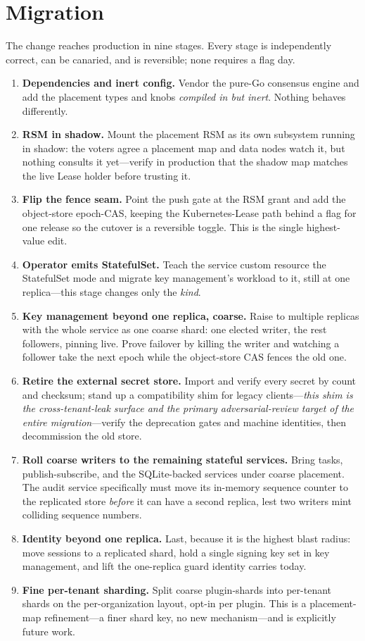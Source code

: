 \documentclass[11pt]{article}
\begin{document}
\section{Migration}
\label{sec:migration}

The change reaches production in nine stages. Every stage is independently
correct, can be canaried, and is reversible; none requires a flag day.

\begin{enumerate}\itemsep2pt
\item \textbf{Dependencies and inert config.} Vendor the pure-Go consensus
engine and add the placement types and knobs \emph{compiled in but inert}.
Nothing behaves differently.
\item \textbf{RSM in shadow.} Mount the placement RSM as its own subsystem
running in shadow: the voters agree a placement map and data nodes watch it,
but nothing consults it yet---verify in production that the shadow map matches
the live Lease holder before trusting it.
\item \textbf{Flip the fence seam.} Point the push gate at the RSM grant and
add the object-store epoch-CAS, keeping the Kubernetes-Lease path behind a
flag for one release so the cutover is a reversible toggle. This is the single
highest-value edit.
\item \textbf{Operator emits StatefulSet.} Teach the service custom resource
the StatefulSet mode and migrate key management's workload to it, still at one
replica---this stage changes only the \emph{kind}.
\item \textbf{Key management beyond one replica, coarse.} Raise to multiple
replicas with the whole service as one coarse shard: one elected writer, the
rest followers, pinning live. Prove failover by killing the writer and
watching a follower take the next epoch while the object-store CAS fences the
old one.
\item \textbf{Retire the external secret store.} Import and verify every
secret by count and checksum; stand up a compatibility shim for legacy
clients---\emph{this shim is the cross-tenant-leak surface and the primary
adversarial-review target of the entire migration}---verify the deprecation
gates and machine identities, then decommission the old store.
\item \textbf{Roll coarse writers to the remaining stateful services.} Bring
tasks, publish-subscribe, and the SQLite-backed services under coarse
placement. The audit service specifically must move its in-memory sequence
counter to the replicated store \emph{before} it can have a second replica,
lest two writers mint colliding sequence numbers.
\item \textbf{Identity beyond one replica.} Last, because it is the highest
blast radius: move sessions to a replicated shard, hold a single signing key
set in key management, and lift the one-replica guard identity carries today.
\item \textbf{Fine per-tenant sharding.} Split coarse plugin-shards into
per-tenant shards on the per-organization layout, opt-in per plugin. This is a
placement-map refinement---a finer shard key, no new mechanism---and is
explicitly future work.
\end{enumerate}
\end{document}
